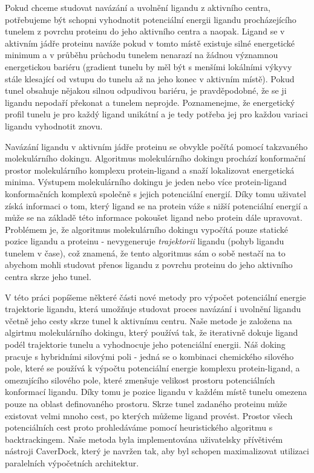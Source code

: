 Pokud chceme studovat navázání a uvolnění ligandu z aktivního centra, potřebujeme
být schopni vyhodnotit potenciální energii ligandu procházejícího tunelem
z povrchu proteinu do jeho aktivního centra a naopak. Ligand se v aktivním
jádře proteinu naváže pokud v tomto místě existuje silné energetické minimum
a v průběhu průchodu tunelem nenarazí na žádnou významnou energetickou bariéru
(gradient tunelu by měl být s menšími lokálními výkyvy stále klesající od
vstupu do tunelu až na jeho konec v aktivním místě). Pokud tunel obsahuje nějakou
silnou odpudivou bariéru, je pravděpodobné, že se ji ligandu nepodaří překonat
a tunelem neprojde. Poznamenejme, že energetický profil tunelu je pro každý
ligand unikátní a je tedy potřeba jej pro každou variaci ligandu vyhodnotit
znovu.

Navázání ligandu v aktivním jádře proteinu se obvykle počítá pomocí takzvaného
molekulárního dokingu. Algoritmus molekulárního dokingu prochází konformační
prostor molekulárního komplexu protein-ligand a snaží lokalizovat energetická
minima. Výstupem molekulárního dokingu je jeden nebo více protein-ligand
konformačních komplexů společně s jejich potenciální energií. Díky tomu
uživatel získá informaci o tom, který ligand se na protein váže s nižší potenciální
energií a může se na základě této informace pokoušet ligand nebo protein
dále upravovat. Problémem je, že algoritmus molekulárního dokingu vypočítá pouze
statické pozice ligandu a proteinu - nevygeneruje \textit{trajektorii} ligandu
(pohyb ligandu tunelem v čase), což znamená, že tento algoritmus sám o sobě
nestačí na to abychom mohli studovat přenos ligandu z povrchu proteinu
do jeho aktivního centra skrze jeho tunel.

V této práci popíšeme některé části nové metody pro výpočet potenciální energie
trajektorie ligandu, která umožňuje studovat proces navázání i uvolnění ligandu
včetně jeho cesty skrze tunel k aktivnímu centru. Naše metode je založena na
algirtmu molekulárního dokingu, který používá tak, že iterativně dokuje ligand
podél trajektorie tunelu a vyhodnocuje jeho potenciální energii. Náš doking
pracuje s hybridními silovými poli - jedná se o kombinaci chemického silového
pole, které se používá k výpočtu potenciální energie komplexu protein-ligand,
a omezujícího silového pole, které zmenšuje velikost prostoru potenciálních
konformací ligandu. Díky tomu je pozice ligandu v každém místě tunelu
omezena pouze na oblast definovaného prostoru. Skrze tunel zadaného proteinu
může existovat velmi mnoho cest, po kterých můžeme ligand provést. Prostor
všech potenciálních cest proto prohledáváme pomocí heuristického algoritmu
s backtrackingem. Naše metoda byla implementována uživatelsky přívětivém
nástroji CaverDock, který je navržen tak, aby byl schopen maximalizovat utilizaci
paralelních výpočetních architektur.


